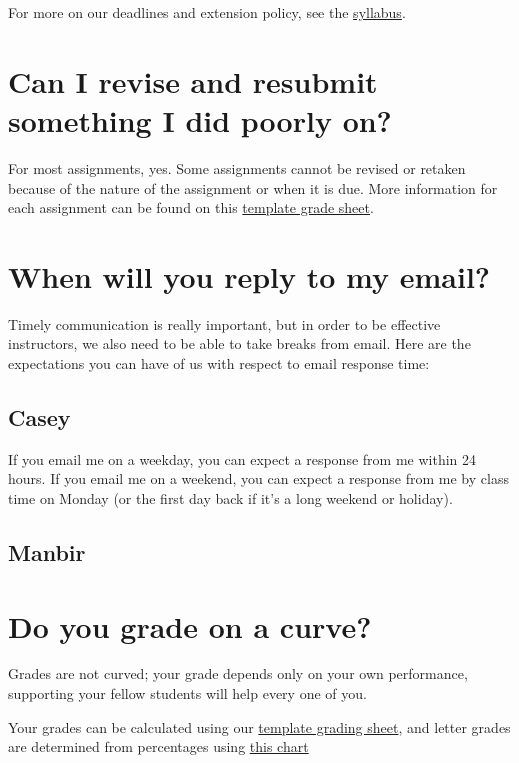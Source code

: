 \documentclass[
  letterpaper,
  DIV=11,
  numbers=noendperiod]{scrartcl}
\begin{document}
For more on our deadlines and extension policy, see the
\href{syllabus.qmd\#deadlines}{syllabus}.

\hypertarget{revisionpolicy}{%
\section{Can I revise and resubmit something I did poorly
on?}\label{revisionpolicy}}

For most assignments, yes. Some assignments cannot be revised or retaken
because of the nature of the assignment or when it is due. More
information for each assignment can be found on this
\href{https://docs.google.com/spreadsheets/d/1o43gE7XIsHia5bAcqoeek3scpJ-EyI1tOqB7SRFVZX0/edit?usp=sharing}{template
grade sheet}.

\hypertarget{emails}{%
\section{When will you reply to my email?}\label{emails}}

Timely communication is really important, but in order to be effective
instructors, we also need to be able to take breaks from email. Here are
the expectations you can have of us with respect to email response time:

\subsection{Casey}

If you email me on a weekday, you can expect a response from me within
24 hours. If you email me on a weekend, you can expect a response from
me by class time on Monday (or the first day back if it's a long weekend
or holiday).

\subsection{Manbir}

\hypertarget{gradingcurve}{%
\section{Do you grade on a curve?}\label{gradingcurve}}

Grades are not curved; your grade depends only on your own performance,
supporting your fellow students will help every one of you.

Your grades can be calculated using our
\href{https://docs.google.com/spreadsheets/d/1o43gE7XIsHia5bAcqoeek3scpJ-EyI1tOqB7SRFVZX0/edit?usp=sharing}{template
grading sheet}, and letter grades are determined from percentages using
\href{syllabus.qmd\#lettergrades}{this chart}
\end{document}
